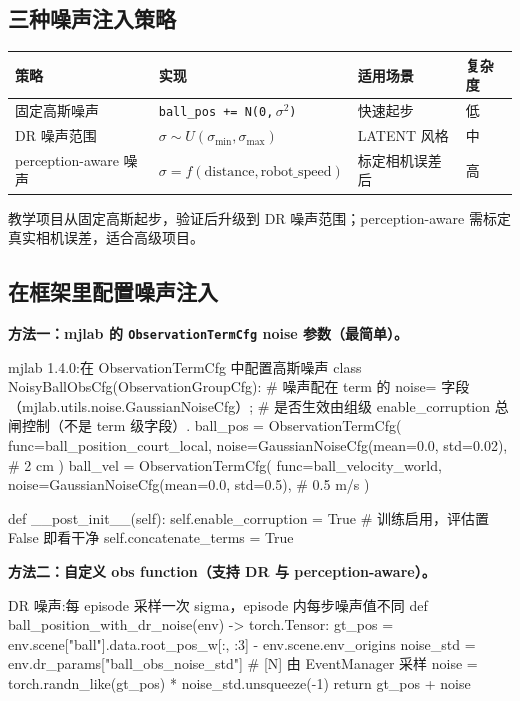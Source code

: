 \subsection{三种噪声注入策略}

\begin{center}
\small
\begin{tabular}{@{}llll@{}}
\toprule
策略 & 实现 & 适用场景 & 复杂度 \\
\midrule
固定高斯噪声 & \texttt{ball\_pos += N(0,$\,\sigma^2$)} & 快速起步 & 低 \\
DR 噪声范围 & $\sigma\sim U(\sigma_{\min},\sigma_{\max})$ & LATENT 风格 & 中 \\
perception-aware 噪声 & $\sigma=f(\text{distance},\text{robot\_speed})$ & 标定相机误差后 & 高 \\
\bottomrule
\end{tabular}
\end{center}

教学项目从固定高斯起步，验证后升级到 DR 噪声范围；perception-aware 需标定真实相机误差，适合高级项目。

\subsection{在框架里配置噪声注入}

\textbf{方法一：mjlab 的 \texttt{ObservationTermCfg} noise 参数（最简单）。}

\begin{codebox}[Python]{mjlab 1.4.0:在 ObservationTermCfg 中配置高斯噪声}
class NoisyBallObsCfg(ObservationGroupCfg):
    # 噪声配在 term 的 noise= 字段（mjlab.utils.noise.GaussianNoiseCfg）;
    # 是否生效由组级 enable_corruption 总闸控制（不是 term 级字段）.
    ball_pos = ObservationTermCfg(
        func=ball_position_court_local,
        noise=GaussianNoiseCfg(mean=0.0, std=0.02),  # 2 cm
    )
    ball_vel = ObservationTermCfg(
        func=ball_velocity_world,
        noise=GaussianNoiseCfg(mean=0.0, std=0.5),   # 0.5 m/s
    )

    def __post_init__(self):
        self.enable_corruption = True    # 训练启用，评估置 False 即看干净
        self.concatenate_terms = True
\end{codebox}

\textbf{方法二：自定义 obs function（支持 DR 与 perception-aware）。}

\begin{codebox}[Python]{DR 噪声:每 episode 采样一次 sigma，episode 内每步噪声值不同}
def ball_position_with_dr_noise(env) -> torch.Tensor:
    gt_pos = env.scene["ball"].data.root_pos_w[:, :3] - env.scene.env_origins
    noise_std = env.dr_params["ball_obs_noise_std"]   # [N] 由 EventManager 采样
    noise = torch.randn_like(gt_pos) * noise_std.unsqueeze(-1)
    return gt_pos + noise
\end{codebox}

